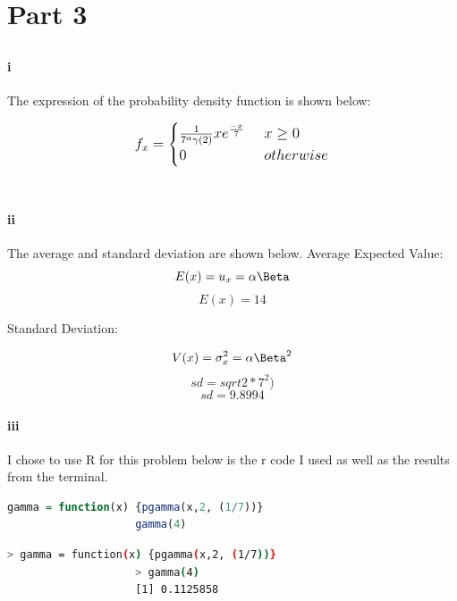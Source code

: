 \documentclass[letterpaper, onecolumn,10pt]{IEEEtran}
\begin{document}
        \section{Part 3}
            \subsection{}
                \paragraph{i}
                    The expression of the probability density function is shown below:
                    
                    \[
                        \mathlarger{
                        f_x =
                        \begin{cases}
                            \frac{1}{7^{\alpha}\gamma(2)}xe^{\frac{-x}{7}} &\ x \geq 0\\
                            0 &\ otherwise\\
                        \end{cases}
                        }
                    \]
                \
            
		        \paragraph{ii}
		            The average and standard deviation are shown below.
		            Average Expected Value:
		            \[E(x) = u_x = \alpha\Beta\]
		            \[E(x) = 14\]
		            
		            Standard Deviation:
		            
		            \[V(x) = \sigma_x^{2} = \alpha\Beta^{2}\]
		            \[sd = sqrt{2*7^2)}\]
		            \[sd = 9.8994\]
		            
		        \paragraph{iii}
		            I chose to use R for this problem below is the r code I used as well as the results from the terminal.
		        \begin{lstlisting}[language=R]
                    gamma = function(x) {pgamma(x,2, (1/7))}
                    gamma(4)
                \end{lstlisting}
                
                \begin{lstlisting}[language=sh]
                    > gamma = function(x) {pgamma(x,2, (1/7))}
                    > gamma(4)
                    [1] 0.1125858
                \end{lstlisting}
                
\end{document}
